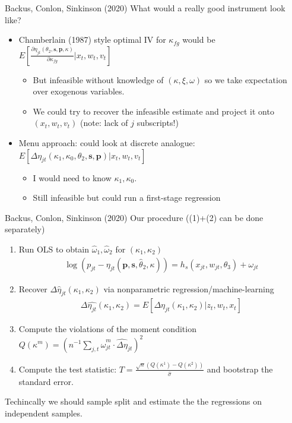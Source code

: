 \documentclass[xcolor=pdftex,dvipsnames,table,mathserif,aspectratio=169]{beamer}
\begin{document}
\begin{frame}{Backus, Conlon, Sinkinson (2020)}
What would a really good instrument look like?
\begin{itemize}
\item Chamberlain (1987) style optimal IV for $\kappa_{fg}$ would be $E\left[\frac{\partial \eta_{jt}(\theta_2,\mathbf{s},\mathbf{p},\kappa)}{\partial \kappa_{fg}} | x_{t}, w_{t}, v_{t}\right]$
\begin{itemize}
\item But infeasible without knowledge of $(\kappa,\xi,\omega)$ so we take expectation over exogenous variables.
\item We could try to recover the infeasible estimate and project it onto $(x_t,w_t,v_t)$ (note: lack of $j$ subscripts!)
\end{itemize}
\item Menu approach: could look at discrete analogue: $E\left[\Delta \eta_{jt}(\kappa_1,\kappa_0,\theta_2,\mathbf{s},\mathbf{p}) | x_{t}, w_{t}, v_{t}\right]$
\begin{itemize}
\item I would need to know $\kappa_1,\kappa_0$.
\item Still infeasible but could run a first-stage regression
\end{itemize}
\end{itemize}
\end{frame}


\begin{frame}{Backus, Conlon, Sinkinson (2020)}
\footnotesize
Our procedure ((1)+(2) can be done separately)
\begin{enumerate}
\item Run OLS to obtain $\widehat{\omega}_1,\widehat{\omega}_2$ for $(\kappa_1,\kappa_2)$
\begin{align*}
\log \left( p_{jt} - \eta_{jt}(\mathbf{p},\mathbf{s},\widehat{\theta}_2,\kappa) \right) = h_s(x_{jt}, w_{jt},\theta_3) + \omega_{jt}
\end{align*}
\item Recover $\Delta \widehat{\eta}_{jt}(\kappa_1,\kappa_2)$ via nonparametric regression/machine-learning
\begin{align*}
\Delta \widehat{\eta_{jt}}(\kappa_1,\kappa_2) = E \left[\Delta \eta_{jt}(\kappa_1,\kappa_2) | z_{t},w_{t},x_{t} \right]
\end{align*}
\item Compute the violations of the moment condition
$Q\left(\kappa^{m}\right)=\left(n^{-1} \sum_{j, t} \hat{\omega}_{j t}^{m} \cdot \widehat{\Delta \eta}_{j t}\right)^{2}$
\item Compute the test statistic: $T=\frac{\sqrt{n}\left(Q\left(\kappa^{1}\right)-Q\left(\kappa^{2}\right)\right)}{\hat{\sigma}}$ and bootstrap the standard error.
\end{enumerate}
Techincally we should \alert{sample split} and estimate the the regressions on \alert{independent} samples.
\end{frame}
\end{document}
